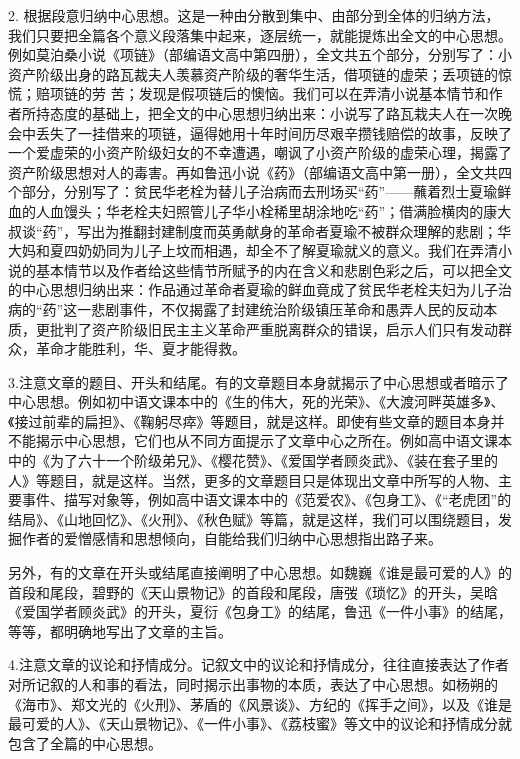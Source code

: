 2. 根据段意归纳中心思想。这是一种由分散到集中、由部分到全体的归纳方法，我们只要把全篇各个意义段落集中起来，逐层统一，就能提炼出全文的中心思想。例如莫泊桑小说《项链》（部编语文高中第四册），全文共五个部分，分别写了：小资产阶级出身的路瓦裁夫人羡慕资产阶级的奢华生活，借项链的虚荣；丢项链的惊慌；赔项链的劳
苦；发现是假项链后的懊恼。我们可以在弄清小说基本情节和作者所持态度的基础上，把全文的中心思想归纳出来：小说写了路瓦栽夫人在一次晚会中丢失了一挂借来的项链，逼得她用十年时间历尽艰辛攒钱赔偿的故事，反映了一个爱虚荣的小资产阶级妇女的不幸遭遇，嘲讽了小资产阶级的虚荣心理，揭露了资产阶级思想对人的毒害。再如鲁迅小说《药》（部编语文高中第一册），全文共四个部分，分别写了：贫民华老栓为替儿子治病而去刑场买“药”——蘸着烈士夏瑜鲜血的人血馒头；华老栓夫妇照管儿子华小栓稀里胡涂地吃“药”；借满脸横肉的康大叔谈“药”，写出为推翻封建制度而英勇献身的革命者夏瑜不被群众理解的悲剧；华大妈和夏四奶奶同为儿子上坟而相遇，却全不了解夏瑜就义的意义。我们在弄清小说的基本情节以及作者给这些情节所赋予的内在含义和悲剧色彩之后，可以把全文的中心思想归纳出来：作品通过革命者夏瑜的鲜血竟成了贫民华老栓夫妇为儿子治病的“药”这一悲剧事件，不仅揭露了封建统治阶级镇压革命和愚弄人民的反动本质，更批判了资产阶级旧民主主义革命严重脱离群众的错误，启示人们只有发动群众，革命才能胜利，华、夏才能得救。

3.注意文章的题目、开头和结尾。有的文章题目本身就揭示了中心思想或者暗示了中心思想。例如初中语文课本中的《生的伟大，死的光荣》、《大渡河畔英雄多》、《接过前辈的扁担》、《鞠躬尽瘁》等题目，就是这样。即使有些文章的题目本身并不能揭示中心思想，它们也从不同方面提示了文章中心之所在。例如高中语文课本中的《为了六十一个阶级弟兄》、《樱花赞》、《爱国学者顾炎武》、《装在套子里的人》等题目，就是这样。当然，更多的文章题目只是体现出文章中所写的人物、主要事件、描写对象等，例如高中语文课本中的《范爱农》、《包身工》、《“老虎团”的结局》、《山地回忆》、《火刑》、《秋色赋》等篇，就是这样，我们可以围绕题目，发掘作者的爱憎感情和思想倾向，自能给我们归纳中心思想指出路子来。

另外，有的文章在开头或结尾直接阐明了中心思想。如魏巍《谁是最可爱的人》的首段和尾段，碧野的《天山景物记》的首段和尾段，唐弢《琐忆》的开头，吴晗《爱国学者顾炎武》的开头，夏衍《包身工》的结尾，鲁迅《一件小事》的结尾，等等，都明确地写出了文章的主旨。

4.注意文章的议论和抒情成分。记叙文中的议论和抒情成分，往往直接表达了作者对所记叙的人和事的看法，同时揭示出事物的本质，表达了中心思想。如杨朔的《海市》、郑文光的《火刑》、茅盾的《风景谈》、方纪的《挥手之间》，以及《谁是最可爱的人》、《天山景物记》、《一件小事》、《荔枝蜜》等文中的议论和抒情成分就包含了全篇的中心思想。

